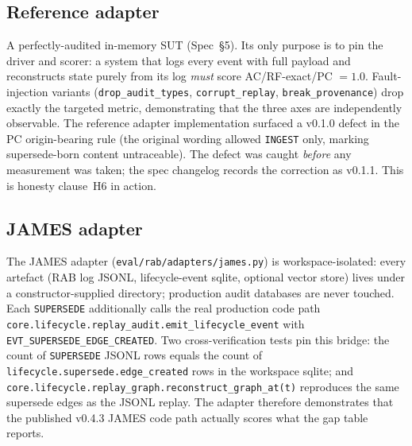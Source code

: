 \documentclass[11pt,a4paper]{article}
\begin{document}
\subsection{Reference adapter}
A perfectly-audited in-memory SUT (Spec~§5). Its only purpose is to pin the driver and scorer: a system that logs every event with full payload and reconstructs state purely from its log \emph{must} score AC/RF-exact/PC $= 1.0$. Fault-injection variants (\texttt{drop\_audit\_types}, \texttt{corrupt\_replay}, \texttt{break\_provenance}) drop exactly the targeted metric, demonstrating that the three axes are independently observable. The reference adapter implementation surfaced a v0.1.0 defect in the PC origin-bearing rule (the original wording allowed \texttt{INGEST} only, marking supersede-born content untraceable). The defect was caught \emph{before} any measurement was taken; the spec changelog records the correction as v0.1.1. This is honesty clause~H6 in action.

\subsection{JAMES adapter}
The JAMES adapter (\texttt{eval/rab/adapters/james.py}) is workspace-isolated: every artefact (RAB log JSONL, lifecycle-event sqlite, optional vector store) lives under a constructor-supplied directory; production audit databases are never touched. Each \texttt{SUPERSEDE} additionally calls the real production code path \texttt{core.lifecycle.replay\_audit.emit\_lifecycle\_event} with \texttt{EVT\_SUPERSEDE\_EDGE\_CREATED}. Two cross-verification tests pin this bridge: the count of \texttt{SUPERSEDE} JSONL rows equals the count of \texttt{lifecycle.supersede.edge\_created} rows in the workspace sqlite; and \texttt{core.lifecycle.replay\_graph.reconstruct\_graph\_at(t)} reproduces the same supersede edges as the JSONL replay. The adapter therefore demonstrates that the published v0.4.3 JAMES code path actually scores what the gap table reports.
\end{document}
